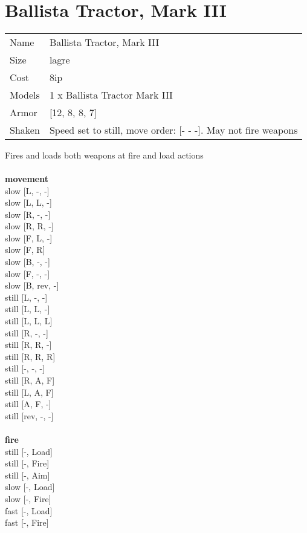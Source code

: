  
\ \\













\clearpage

\section{ Ballista Tractor, Mark III }

\begin{tabular}{ll}
  Name & Ballista Tractor, Mark III \\
  Size & lagre\\
  Cost & 8ip\\
  Models & 1 x Ballista Tractor Mark III\\
  Armor & [12, 8, 8, 7]\\
  Shaken & Speed set to still, move order: [- - -]. May not fire weapons\\
\end{tabular}

\noindent Fires and loads both weapons at fire and load actions\\ 


\ \\ {\bf movement } \\
slow [L, -, -] \\
slow [L, L, -] \\
slow [R, -, -] \\
slow [R, R, -] \\
slow [F, L, -] \\
slow [F, R] \\
slow [B, -, -] \\
slow [F, -, -] \\
slow [B, rev, -] \\
still [L, -, -] \\
still [L, L, -] \\
still [L, L, L] \\
still [R, -, -] \\
still [R, R, -] \\
still [R, R, R] \\
still [-, -, -] \\
still [R, A, F] \\
still [L, A, F] \\
still [A, F, -] \\
still [rev, -, -] \\
\ \\ {\bf fire } \\
still [-, Load] \\
still [-, Fire] \\
still [-, Aim] \\
slow [-, Load] \\
slow [-, Fire] \\
fast [-, Load] \\
fast [-, Fire] \\



